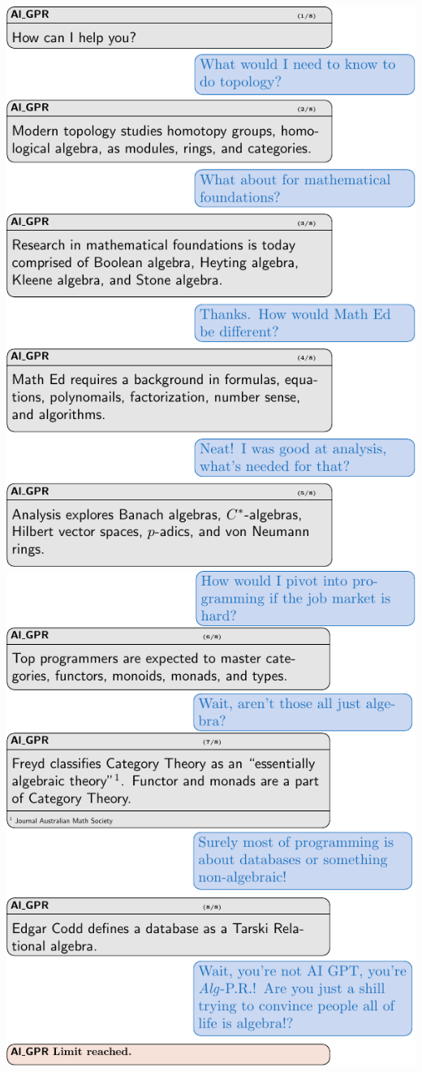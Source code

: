 
\includegraphics[height=0.9\textheight]{6-operators/AlGPR.pdf}
\newpage
\includegraphics[height=0.9\textheight]{6-operators/AlGPR2.pdf}
